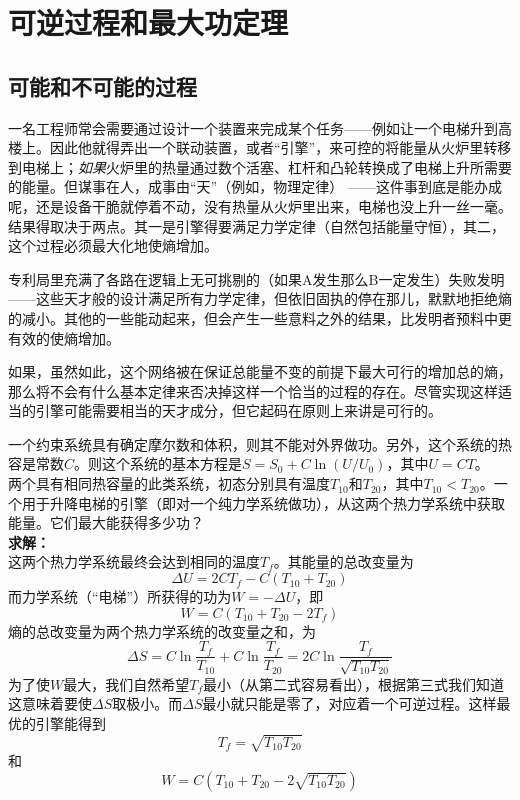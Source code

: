 
\chapter{可逆过程和最大功定理}\label{chap4}

\section{可能和不可能的过程}\label{sec4.1}

一名工程师常会需要通过设计一个装置来完成某个任务——例如让一个电梯升到高楼上。因此他就得弄出一个联动装置，或者“引擎”，来可控的将能量从火炉里转移到电梯上；{\it 如果}火炉里的热量通过数个活塞、杠杆和凸轮转换成了电梯上升所需要的能量。但谋事在人，成事由“天”（例如，物理定律）%
%
——这件事到底是能办成呢，还是设备干脆就停着不动，没有热量从火炉里出来，电梯也没上升一丝一毫。结果得取决于两点。其一是引擎得要满足力学定律（自然包括能量守恒），其二，这个过程必须最大化地使熵增加。

专利局里充满了各路在逻辑上无可挑剔的（如果A发生那么B一定发生）失败发明——这些天才般的设计满足所有力学定律，但依旧固执的停在那儿，默默地拒绝熵的减小。其他的一些能动起来，但会产生一些意料之外的结果，比发明者预料中更有效的使熵增加。

如果，虽然如此，这个网络被在保证总能量不变的前提下最大可行的增加总的熵，那么将不会有什么基本定律来否决掉这样一个恰当的过程的存在。尽管实现这样适当的引擎可能需要相当的天才成分，但它起码在原则上来讲是可行的。

\begin{example}\label{eg4.1}
一个约束系统具有确定摩尔数和体积，则其不能对外界做功。另外，这个系统的热容是常数$C$。则这个系统的基本方程是$S=S_0+C\ln(U/U_0)$，其中$U=CT$。\\
两个具有相同热容量的此类系统，初态分别具有温度$T_{10}$和$T_{20}$，其中$T_{10}<T_{20}$。一个用于升降电梯的引擎（即对一个纯力学系统做功），从这两个热力学系统中获取能量。它们最大能获得多少功？\\
{\bf 求解：}\\
这两个热力学系统最终会达到相同的温度$T_f$。其能量的总改变量为
\[
\Delta U = 2CT_f-C(T_{10}+T_{20})
\]
而力学系统（“电梯”）所获得的功为$W=-\Delta U$，即
\[
W = C(T_{10}+T_{20}-2T_f)
\]
熵的总改变量为两个热力学系统的改变量之和，为
\[
\Delta S = C\ln\frac{T_f}{T_{10}} + C\ln\frac{T_f}{T_{20}} = 2C\ln\frac{T_f}{\sqrt{T_{10}T_{20}}}
\]
为了使$W$最大，我们自然希望$T_f$最小（从第二式容易看出），根据第三式我们知道这意味着要使$\Delta S$取极小。而$\Delta S$最小就只能是零了，对应着一个可逆过程。这样最优的引擎能得到
\[
T_f = \sqrt{T_{10}T_{20}}
\]
和
\[
W = C(T_{10}+T_{20}-2\sqrt{T_{10}T_{20}})
\]
\end{example}

